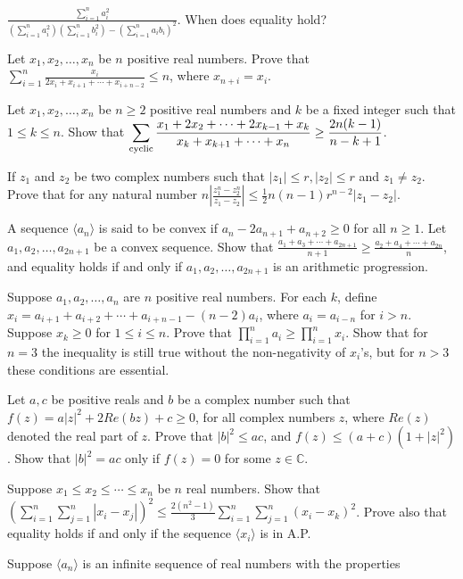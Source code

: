   $\frac{\sum_{i=1}^na_i^2}{\left(\sum_{i=1}^na_i^2\right)\left(\sum_{i=1}^nb_i^2\right) - \left(\sum_{i=1}^na_ib_i\right)^2}$.
  When does equality hold?
\item Let $x_1, x_2, \ldots, x_n$ be $n$ positive real numbers. Prove that $\displaystyle\sum_{i=1}^n\frac{x_i}{2x_i + x_{i + 1} +
  \cdots + x_{i + n - 2}}\leq n$, where $x_{n + i} = x_i$.
\item Let $x_1, x_2, \ldots, x_n$ be $n\geq 2$ positive real numbers and $k$ be a fixed integer such that $1\leq k\leq n$. Show
  that $\displaystyle\sum_{\rm cyclic}\frac{x_1 + 2x_2 + \cdots + 2x_{k - 1} + x_k}{x_k + x_{k + 1} + \cdots + x_n}\geq \frac{2n(k
    - 1)}{n - k + 1}$.
\item If $z_1$ and $z_2$ be two complex numbers such that $|z_1| \leq r, |z_2|\leq r$ and $z_1\neq z_2$. Prove that for any natural
  number $n\left|\frac{z_1^n - z_2^n}{z_1 - z_2}\right|\leq \frac{1}{2}n(n - 1)r^{n - 2}|z_1 - z_2|$.
\item A sequence $\langle a_n\rangle$ is said to be convex if $a_n - 2a_{n + 1} + a_{n + 2}\geq 0$ for all $n\geq 1$. Let $a_1,
  a_2, \ldots, a_{2n + 1}$ be a convex sequence. Show that $\frac{a_1 + a_3 + \cdots + a_{2n + 1}}{n + 1}\geq \frac{a_2 + a_4 +
    \cdots + a_{2n}}{n}$, and equality holds if and only if $a_1, a_2, \ldots, a_{2n + 1}$ is an arithmetic progression.
\item Suppose $a_1, a_2, \ldots, a_n$ are $n$ positive real numbers. For each $k$, define $x_i = a_{i + 1} + a_{i + 2} + \cdots +
  a_{i + n - 1} - (n - 2)a_i$, where $a_i = a_{i - n}$ for $i > n$. Suppose $x_k\geq 0$ for $1\leq i\leq n$. Prove that
  $\displaystyle \prod_{i=1}^na_i\geq\prod_{i = 1}^nx_i$. Show that for $n = 3$ the inequality is still true without the
  non-negativity of $x_i$'s, but for $n > 3$ these conditions are essential.
\item Let $a, c$ be positive reals and $b$ be a complex number such that $f(z) = a|z|^2 + 2Re(bz) + c\geq 0$, for all complex
  numbers $z$, where $Re(z)$ denoted the real part of $z$. Prove that $|b|^2\leq ac$, and $f(z)\leq (a + c)(1 + |z|^2)$. Show that
  $|b|^2 = ac$ only if $f(z) = 0$ for some $z\in\mathbb{C}$.
\item Suppose $x_1\leq x_2\leq \cdots\leq x_n$ be $n$ real numbers. Show that $\displaystyle\left(\sum_{i=1}^n\sum_{j=1}^n|x_i -
  x_j|\right)^2\leq \frac{2(n^2 - 1)}{3}\sum_{i=1}^n\sum_{j = 1}^n(x_i - x_k)^2$. Prove also that equality holds if and only if
  the sequence $\langle x_i\rangle$ is in A.P.
\item Suppose $\langle a_n\rangle$ is an infinite sequence of real numbers with the properties

